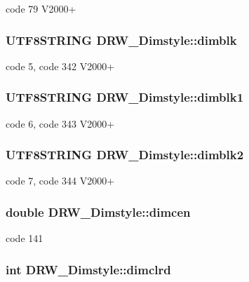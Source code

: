 code 79 V2000+ \hypertarget{classDRW__Dimstyle_a2f64034b5654fee47038933c565a2e51}{
\subsubsection[{dimblk}]{\setlength{\rightskip}{0pt plus 5cm}U\-T\-F8\-S\-T\-R\-I\-N\-G D\-R\-W\-\_\-\-Dimstyle\-::dimblk}}\label{classDRW__Dimstyle_a2f64034b5654fee47038933c565a2e51}
code 5, code 342 V2000+ \hypertarget{classDRW__Dimstyle_a33a57c5c614537649e042eef57a03f9d}{
\subsubsection[{dimblk1}]{\setlength{\rightskip}{0pt plus 5cm}U\-T\-F8\-S\-T\-R\-I\-N\-G D\-R\-W\-\_\-\-Dimstyle\-::dimblk1}}\label{classDRW__Dimstyle_a33a57c5c614537649e042eef57a03f9d}
code 6, code 343 V2000+ \hypertarget{classDRW__Dimstyle_a65761962dbaff5d150f4a9296efeadfc}{
\subsubsection[{dimblk2}]{\setlength{\rightskip}{0pt plus 5cm}U\-T\-F8\-S\-T\-R\-I\-N\-G D\-R\-W\-\_\-\-Dimstyle\-::dimblk2}}\label{classDRW__Dimstyle_a65761962dbaff5d150f4a9296efeadfc}
code 7, code 344 V2000+ \hypertarget{classDRW__Dimstyle_a3b2ea8efe76c60db85c14dcc8724a7f6}{
\subsubsection[{dimcen}]{\setlength{\rightskip}{0pt plus 5cm}double D\-R\-W\-\_\-\-Dimstyle\-::dimcen}}\label{classDRW__Dimstyle_a3b2ea8efe76c60db85c14dcc8724a7f6}
code 141 \hypertarget{classDRW__Dimstyle_ae1768dfc1e5a2986125affd928cc1278}{
\subsubsection[{dimclrd}]{\setlength{\rightskip}{0pt plus 5cm}int D\-R\-W\-\_\-\-Dimstyle\-::dimclrd}}\label{classDRW__Dimstyle_ae1768dfc1e5a2986125affd928cc1278}
